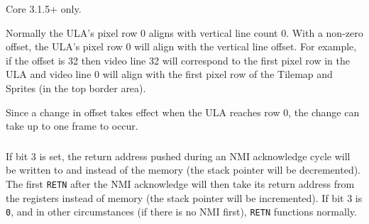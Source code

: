\begin{NextPort}
\end{NextPort}

Core 3.1.5+ only.

Normally the ULA's pixel row 0 aligns with vertical line count 0. With a non-zero offset, the ULA's pixel row 0 will align with the vertical line offset. For example, if the offset is 32 then video line 32 will correspond to the first pixel row in the ULA and video line 0 will align with the first pixel row of the Tilemap and Sprites (in the top border area).

Since a change in offset takes effect when the ULA reaches row 0, the change can take up to one frame to occur.


\subsubsection{}

\begin{NextPort}
\end{NextPort}

If bit 3 is set, the return address pushed during an NMI acknowledge cycle will be written to  and  instead of the memory (the stack pointer will be decremented). The first {\tt RETN} after the NMI acknowledge will then take its return address from the registers instead of memory (the stack pointer will be incremented). If bit 3 is {\tt 0}, and in other circumstances (if there is no NMI first), {\tt RETN} functions normally.


\subsubsection{}
\vspace*{-2ex}
\subsubsection{}

